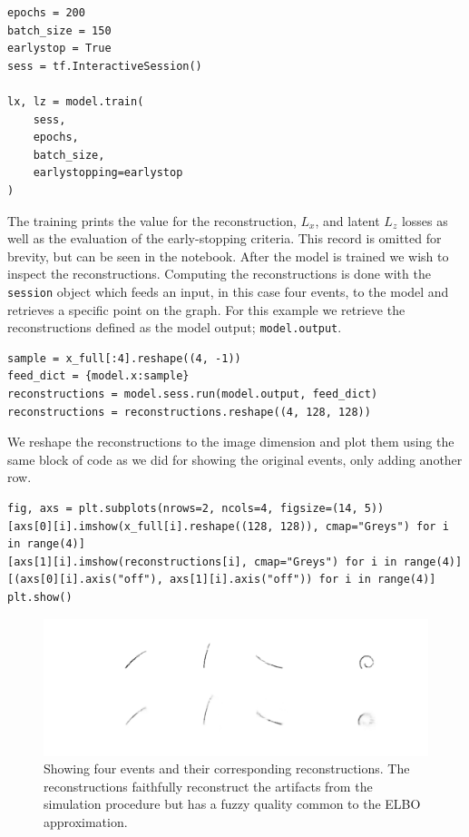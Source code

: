 \begin{minipage}{\linewidth}
\begin{lstlisting}[language=iPython]
epochs = 200
batch_size = 150
earlystop = True
sess = tf.InteractiveSession()

lx, lz = model.train(
    sess,
    epochs,
    batch_size,
    earlystopping=earlystop
)
\end{lstlisting}
\end{minipage}

\noindent The training prints the value for the reconstruction, $L_x$, and latent $L_z$ losses as well as the evaluation of the early-stopping criteria. This record is omitted for brevity, but can be seen in the notebook. After the model is trained we wish to inspect the reconstructions. Computing the reconstructions is done with the \lstinline{session} object which feeds an input, in this case four events, to the model and retrieves a specific point on the graph. For this example we retrieve the reconstructions defined as the model output; \lstinline{model.output}.

\begin{minipage}{\linewidth}
\begin{lstlisting}[language=iPython]
sample = x_full[:4].reshape((4, -1))
feed_dict = {model.x:sample}
reconstructions = model.sess.run(model.output, feed_dict)
reconstructions = reconstructions.reshape((4, 128, 128))
\end{lstlisting}
\end{minipage}

\noindent We reshape the reconstructions to the image dimension and plot them using the same block of code as we did for showing the original events, only adding another row. 

\begin{minipage}{\linewidth}
\begin{lstlisting}[language=iPython]
fig, axs = plt.subplots(nrows=2, ncols=4, figsize=(14, 5))
[axs[0][i].imshow(x_full[i].reshape((128, 128)), cmap="Greys") for i in range(4)]
[axs[1][i].imshow(reconstructions[i], cmap="Greys") for i in range(4)]
[(axs[0][i].axis("off"), axs[1][i].axis("off")) for i in range(4)]
plt.show()
\end{lstlisting}
\begin{figure}[H]
\centering
\includegraphics[width=\textwidth]{reconst_sim_events.pdf}
\caption[Simulated events and reconstructions]{Showing four events and their corresponding reconstructions. The reconstructions faithfully reconstruct the artifacts from the simulation procedure but has a fuzzy quality common to the ELBO approximation.}\label{fig:reconst_sim}
\end{figure}
\end{minipage}

